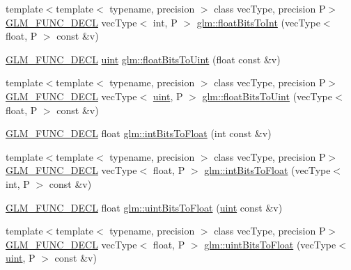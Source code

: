 \begin{DoxyCompactItemize}
\item 
{\footnotesize template$<$template$<$ typename, precision $>$ class vec\+Type, precision P$>$ }\\\hyperlink{setup_8hpp_ab2d052de21a70539923e9bcbf6e83a51}{G\+L\+M\+\_\+\+F\+U\+N\+C\+\_\+\+D\+E\+CL} vec\+Type$<$ int, P $>$ \hyperlink{group__core__func__common_gac4a0710238ae54c67931dd29a0b0f873}{glm\+::float\+Bits\+To\+Int} (vec\+Type$<$ float, P $>$ const \&v)
\item 
\hyperlink{setup_8hpp_ab2d052de21a70539923e9bcbf6e83a51}{G\+L\+M\+\_\+\+F\+U\+N\+C\+\_\+\+D\+E\+CL} \hyperlink{group__core__precision_ga4fd29415871152bfb5abd588334147c8}{uint} \hyperlink{group__core__func__common_ga748b4d2819b48d28ca09dc8733488873}{glm\+::float\+Bits\+To\+Uint} (float const \&v)
\item 
{\footnotesize template$<$template$<$ typename, precision $>$ class vec\+Type, precision P$>$ }\\\hyperlink{setup_8hpp_ab2d052de21a70539923e9bcbf6e83a51}{G\+L\+M\+\_\+\+F\+U\+N\+C\+\_\+\+D\+E\+CL} vec\+Type$<$ \hyperlink{group__core__precision_ga4fd29415871152bfb5abd588334147c8}{uint}, P $>$ \hyperlink{group__core__func__common_ga1804d4c443605d8a27be644aa461afe4}{glm\+::float\+Bits\+To\+Uint} (vec\+Type$<$ float, P $>$ const \&v)
\item 
\hyperlink{setup_8hpp_ab2d052de21a70539923e9bcbf6e83a51}{G\+L\+M\+\_\+\+F\+U\+N\+C\+\_\+\+D\+E\+CL} float \hyperlink{group__core__func__common_ga2650dc57b2148a6ffbce20944fb4d97a}{glm\+::int\+Bits\+To\+Float} (int const \&v)
\item 
{\footnotesize template$<$template$<$ typename, precision $>$ class vec\+Type, precision P$>$ }\\\hyperlink{setup_8hpp_ab2d052de21a70539923e9bcbf6e83a51}{G\+L\+M\+\_\+\+F\+U\+N\+C\+\_\+\+D\+E\+CL} vec\+Type$<$ float, P $>$ \hyperlink{group__core__func__common_gad21ab176dd0e6b59d923db5efca87f4e}{glm\+::int\+Bits\+To\+Float} (vec\+Type$<$ int, P $>$ const \&v)
\item 
\hyperlink{setup_8hpp_ab2d052de21a70539923e9bcbf6e83a51}{G\+L\+M\+\_\+\+F\+U\+N\+C\+\_\+\+D\+E\+CL} float \hyperlink{group__core__func__common_ga97464ca9ff4267de30ea408f700d4ca8}{glm\+::uint\+Bits\+To\+Float} (\hyperlink{group__core__precision_ga4fd29415871152bfb5abd588334147c8}{uint} const \&v)
\item 
{\footnotesize template$<$template$<$ typename, precision $>$ class vec\+Type, precision P$>$ }\\\hyperlink{setup_8hpp_ab2d052de21a70539923e9bcbf6e83a51}{G\+L\+M\+\_\+\+F\+U\+N\+C\+\_\+\+D\+E\+CL} vec\+Type$<$ float, P $>$ \hyperlink{group__core__func__common_ga3acab37650ecd792dc84548094b58684}{glm\+::uint\+Bits\+To\+Float} (vec\+Type$<$ \hyperlink{group__core__precision_ga4fd29415871152bfb5abd588334147c8}{uint}, P $>$ const \&v)

\end{DoxyCompactItemize}
